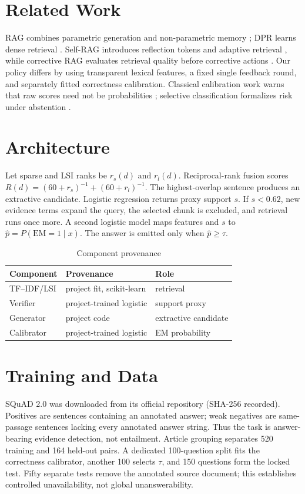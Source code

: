 \documentclass[conference]{IEEEtran}
\begin{document}
\section{Related Work}RAG combines parametric generation and non-parametric memory \cite{lewis2020rag}; DPR learns dense retrieval \cite{karpukhin2020dpr}. Self-RAG introduces reflection tokens and adaptive retrieval \cite{asai2024selfrag}, while corrective RAG evaluates retrieval quality before corrective actions \cite{yan2024crag}. Our policy differs by using transparent lexical features, a fixed single feedback round, and separately fitted correctness calibration. Classical calibration work warns that raw scores need not be probabilities \cite{guo2017calibration}; selective classification formalizes risk under abstention \cite{geifman2017selective}.
\section{Architecture}Let sparse and LSI ranks be $r_s(d)$ and $r_l(d)$. Reciprocal-rank fusion scores $R(d)=(60+r_s)^{-1}+(60+r_l)^{-1}$. The highest-overlap sentence produces an extractive candidate. Logistic regression returns proxy support $s$. If $s<0.62$, new evidence terms expand the query, the selected chunk is excluded, and retrieval runs once more. A second logistic model maps features and $s$ to $\hat p=P(\mathrm{EM}=1\mid x)$. The answer is emitted only when $\hat p\ge\tau$.
\begin{table}[b]\centering\caption{Component provenance}\scriptsize\begin{tabular}{lll}\toprule Component&Provenance&Role\\\midrule TF--IDF/LSI&project fit, scikit-learn&retrieval\\Verifier&project-trained logistic&support proxy\\Generator&project code&extractive candidate\\Calibrator&project-trained logistic&EM probability\\\bottomrule\end{tabular}\end{table}
\clearpage
\section{Training and Data}SQuAD 2.0 \cite{rajpurkar2018know} was downloaded from its official repository (SHA-256 recorded). Positives are sentences containing an annotated answer; weak negatives are same-passage sentences lacking every annotated answer string. Thus the task is answer-bearing evidence detection, not entailment. Article grouping separates 520 training and 164 held-out pairs. A dedicated 100-question split fits the correctness calibrator, another 100 selects $\tau$, and 150 questions form the locked test. Fifty separate tests remove the annotated source document; this establishes controlled unavailability, not global unanswerability.
\end{document}
